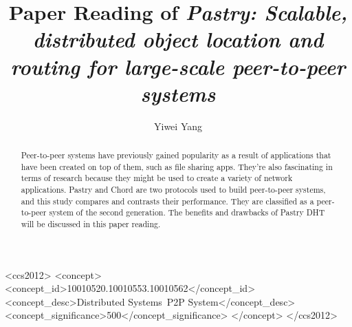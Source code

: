 \documentclass[acmlarge]{acmart}
\begin{document}
\title{Paper Reading of \textit{Pastry: Scalable, distributed object location and routing for large-scale peer-to-peer systems}}

\author{Yiwei Yang}

\renewcommand{\shortauthors}{Yiwei Yang}

\begin{abstract}
  Peer-to-peer systems have previously gained popularity as a result of applications that have been created on top of them, such as file sharing apps. They're also fascinating in terms of research because they might be used to create a variety of network applications. Pastry and Chord are two protocols used to build peer-to-peer systems, and this study compares and contrasts their performance. They are classified as a peer-to-peer system of the second generation. The benefits and drawbacks of Pastry DHT will be discussed in this paper reading.
\end{abstract}

\begin{CCSXML}
  <ccs2012>
  <concept>
  <concept_id>10010520.10010553.10010562</concept_id>
  <concept_desc>Distributed Systems~P2P System</concept_desc>
  <concept_significance>500</concept_significance>
  </concept>
  </ccs2012>
\end{CCSXML}

\end{document}
